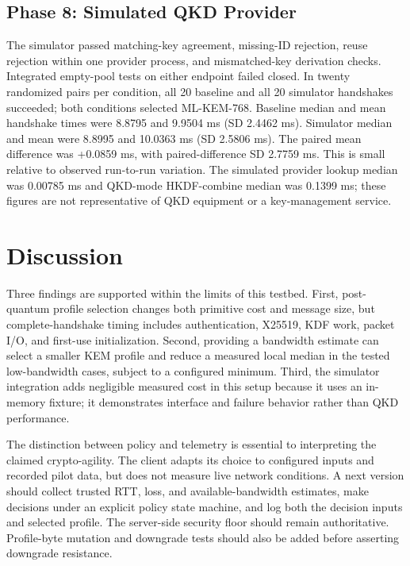 \documentclass[journal]{IEEEtran}
\begin{document}
\subsection{Phase 8: Simulated QKD Provider}
The simulator passed matching-key agreement, missing-ID rejection, reuse rejection within one provider process, and mismatched-key derivation checks. Integrated empty-pool tests on either endpoint failed closed. In twenty randomized pairs per condition, all 20 baseline and all 20 simulator handshakes succeeded; both conditions selected ML-KEM-768. Baseline median and mean handshake times were 8.8795 and 9.9504 ms (SD 2.4462 ms). Simulator median and mean were 8.8995 and 10.0363 ms (SD 2.5806 ms). The paired mean difference was +0.0859 ms, with paired-difference SD 2.7759 ms. This is small relative to observed run-to-run variation. The simulated provider lookup median was 0.00785 ms and QKD-mode HKDF-combine median was 0.1399 ms; these figures are not representative of QKD equipment or a key-management service.

\section{Discussion}
Three findings are supported within the limits of this testbed. First, post-quantum profile selection changes both primitive cost and message size, but complete-handshake timing includes authentication, X25519, KDF work, packet I/O, and first-use initialization. Second, providing a bandwidth estimate can select a smaller KEM profile and reduce a measured local median in the tested low-bandwidth cases, subject to a configured minimum. Third, the simulator integration adds negligible measured cost in this setup because it uses an in-memory fixture; it demonstrates interface and failure behavior rather than QKD performance.

The distinction between policy and telemetry is essential to interpreting the claimed crypto-agility. The client adapts its choice to configured inputs and recorded pilot data, but does not measure live network conditions. A next version should collect trusted RTT, loss, and available-bandwidth estimates, make decisions under an explicit policy state machine, and log both the decision inputs and selected profile. The server-side security floor should remain authoritative. Profile-byte mutation and downgrade tests should also be added before asserting downgrade resistance.
\end{document}

